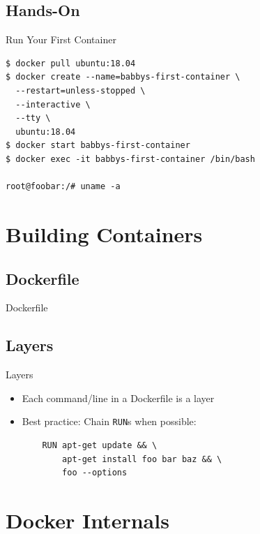 \documentclass{beamer}
\begin{document}
\subsection{Hands-On}

\begin{frame}[fragile]{Run Your First Container}
\begin{lstlisting}
$ docker pull ubuntu:18.04
$ docker create --name=babbys-first-container \
  --restart=unless-stopped \
  --interactive \
  --tty \
  ubuntu:18.04
$ docker start babbys-first-container
$ docker exec -it babbys-first-container /bin/bash

root@foobar:/# uname -a
\end{lstlisting}
\end{frame}

\section{Building Containers}

\subsection{Dockerfile}

\begin{frame}{Dockerfile}
\cdots
\end{frame}

\subsection{Layers}

\begin{frame}[fragile]{Layers}

\begin{itemize}
    \item Each command/line in a Dockerfile is a layer
    \item Best practice: Chain \texttt{RUN}s when possible:
    \begin{lstlisting}
    RUN apt-get update && \
        apt-get install foo bar baz && \
        foo --options
    \end{lstlisting}
\end{itemize}
    
\end{frame}

\section{Docker Internals}
\end{document}
